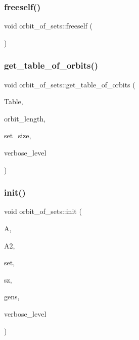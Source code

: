 \subsubsection{\texorpdfstring{freeself()}{freeself()}}
{\footnotesize\ttfamily void orbit\+\_\+of\+\_\+sets\+::freeself (\begin{DoxyParamCaption}{ }\end{DoxyParamCaption})}

\mbox{\label{classorbit__of__sets_a9b124cb1300665f7d4328368b02e142e}} 
\subsubsection{\texorpdfstring{get\+\_\+table\+\_\+of\+\_\+orbits()}{get\_table\_of\_orbits()}}
{\footnotesize\ttfamily void orbit\+\_\+of\+\_\+sets\+::get\+\_\+table\+\_\+of\+\_\+orbits (\begin{DoxyParamCaption}\item[{\mbox{\hyperlink{galois_8h_a09fddde158a3a20bd2dcadb609de11dc}{I\+NT}} $\ast$\&}]{Table,  }\item[{\mbox{\hyperlink{galois_8h_a09fddde158a3a20bd2dcadb609de11dc}{I\+NT}} \&}]{orbit\+\_\+length,  }\item[{\mbox{\hyperlink{galois_8h_a09fddde158a3a20bd2dcadb609de11dc}{I\+NT}} \&}]{set\+\_\+size,  }\item[{\mbox{\hyperlink{galois_8h_a09fddde158a3a20bd2dcadb609de11dc}{I\+NT}}}]{verbose\+\_\+level }\end{DoxyParamCaption})}

\mbox{\label{classorbit__of__sets_a83ca294d6cb9bc87c0d3dd3f0873f240}} 
\subsubsection{\texorpdfstring{init()}{init()}}
{\footnotesize\ttfamily void orbit\+\_\+of\+\_\+sets\+::init (\begin{DoxyParamCaption}\item[{\mbox{\hyperlink{classaction}{action}} $\ast$}]{A,  }\item[{\mbox{\hyperlink{classaction}{action}} $\ast$}]{A2,  }\item[{\mbox{\hyperlink{galois_8h_a09fddde158a3a20bd2dcadb609de11dc}{I\+NT}} $\ast$}]{set,  }\item[{\mbox{\hyperlink{galois_8h_a09fddde158a3a20bd2dcadb609de11dc}{I\+NT}}}]{sz,  }\item[{\mbox{\hyperlink{classvector__ge}{vector\+\_\+ge}} $\ast$}]{gens,  }\item[{\mbox{\hyperlink{galois_8h_a09fddde158a3a20bd2dcadb609de11dc}{I\+NT}}}]{verbose\+\_\+level }\end{DoxyParamCaption})}

